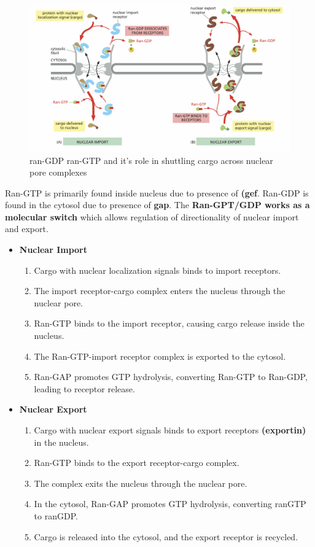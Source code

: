 \documentclass[../main.tex]{subfiles}
\begin{document}
\begin{figure}[H]
    \centering
    \includegraphics[width=\linewidth]{RanGDP.png}
    \caption{ran-GDP ran-GTP and it's role in shuttling cargo across nuclear pore complexes}
    \label{fig:enter-label}
\end{figure}

Ran-GTP is primarily found inside nucleus due to presence of \textbf{(\gls{gef}}. Ran-GDP is found in the cytosol due to presence of \textbf{\gls{gap}}. The \textbf{Ran-GPT/GDP works as a molecular switch} which allows regulation of directionality of nuclear import and export.
\begin{itemize}
    \item \textbf{Nuclear Import}
    \begin{enumerate}
        \item Cargo with nuclear localization signals binds to import receptors.
        \item The import receptor-cargo complex enters the nucleus through the nuclear pore.
        \item Ran-GTP binds to the import receptor, causing cargo release inside the nucleus.
        \item The Ran-GTP-import receptor complex is exported to the cytosol.
        \item Ran-GAP promotes GTP hydrolysis, converting Ran-GTP to Ran-GDP, leading to receptor release.
    \end{enumerate}
    
    \item \textbf{Nuclear Export}
    \begin{enumerate}
   
        \item Cargo with nuclear export signals binds to export receptors \textbf{(\gls{exportin})} in the nucleus.
        \item Ran-GTP binds to the export receptor-cargo complex.
        \item The complex exits the nucleus through the nuclear pore.
        \item In the cytosol, Ran-GAP promotes GTP hydrolysis, converting \gls{ranGTP} to \gls{ranGDP}.
        \item Cargo is released into the cytosol, and the export receptor is recycled.
    \end{enumerate}
\end{itemize}
\end{document}
